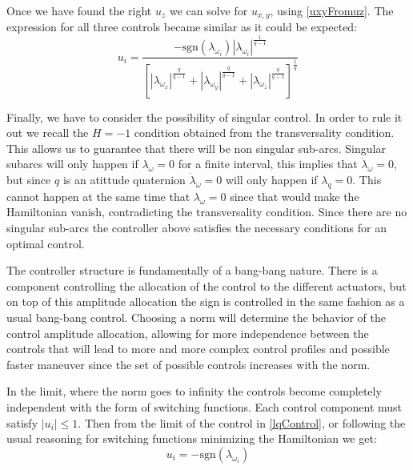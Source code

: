 Once we have found the right $u_z$ we can solve for $u_{x,y}$, using \ref{uxyFromuz}. The expression for all three controls became similar as it could be expected:
\begin{equation}
\label{lqControl}
u_i = 
\frac{-\text{sgn}(\lambda_{\omega_{i}}) |\lambda_{\omega_{i}}|^{\frac{1}{q-1}}}
{\left[ |\lambda_{\omega_x}|^{\frac{q}{q-1}} + |\lambda_{\omega_y}|^{\frac{q}{q-1}} + |\lambda_{\omega_z}|^{\frac{q}{q-1}}\right]^\frac{1}{q}}
\end{equation}

Finally, we have to consider the possibility of singular control. In order to rule it out we recall the $H=-1$ condition obtained from the transversality condition. This allows us to guarantee that there will be non singular sub-arcs. Singular subarcs will only happen if $\lambda_\omega = 0$ for a finite interval, this implies that $\dot{\lambda}_\omega = 0$, but since $q$ is an atittude quaternion $\dot{\lambda}_\omega = 0$ will only happen if $\lambda_q=0$. This cannot happen at the same time that $\lambda_\omega = 0$ since that would make the Hamiltonian vanish, contradicting the transversality condition. Since there are no singular sub-arcs the controller above satisfies the necessary conditions for an optimal control. 

The controller structure is fundamentally of a bang-bang nature. There is a component controlling the allocation of the control to the different actuators, but on top of this amplitude allocation the sign is controlled in the same fashion as a usual bang-bang control. Choosing a norm will determine the behavior of the control amplitude allocation, allowing for more independence between the controls that will lead to more and more complex control profiles and possible faster maneuver since the set of possible controls increases with the norm. 

In the limit, where the norm goes to infinity the controls become completely independent with the form of switching functions. Each control component must satisfy $|u_i|\leq 1$. Then from the limit of the control in \ref{lqControl}, or following the usual reasoning for switching functions minimizing the Hamiltonian we get:
\begin{equation}
\label{lInfinityControl}
u_i = -\text{sgn}(\lambda_{\omega_{i}})
\end{equation}